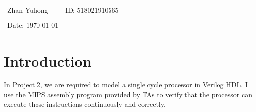 \documentclass{article}
\begin{document}
\vspace{0.4cm}

\hrulefill

\thispagestyle{empty}

\begin{center}
\begin{large}
\end{large}

\hrulefill

\vspace*{5cm}


\vspace{2em}

\begin{large}
\end{large}
\end{center}


\vfill

\begin{table}[h!]
\flushleft
\begin{tabular}{lll}

Zhan Yuhong\hspace*{2em}&
ID: 518021910565\hspace*{2em}\\

\\

Date: \today 

\end{tabular}
\end{table}


\newpage





\section{Introduction}

In Project 2, we are required to model a single cycle processor in Verilog HDL. I use the MIPS assembly program provided by TAs to verify that the processor can execute those instructions continuously and correctly.
\end{document}
